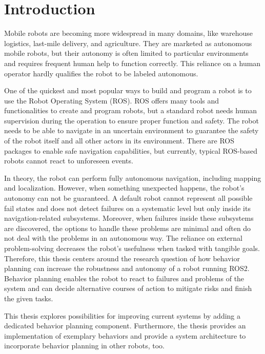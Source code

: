 \chapter{Introduction}
\label{cha:introduction}

Mobile robots are becoming more widespread in many domains, like warehouse logistics, last-mile delivery, and agriculture. They are marketed as autonomous mobile robots, but their autonomy is often limited to particular environments and requires frequent human help to function correctly. This reliance on a human operator hardly qualifies the robot to be labeled autonomous. 

One of the quickest and most popular ways to build and program a robot is to use the Robot Operating System (ROS). ROS offers many tools and functionalities to create and program robots, but a standard robot needs human supervision during the operation to ensure proper function and safety. The robot needs to be able to navigate in an uncertain environment to guarantee the safety of the robot itself and all other actors in its environment. There are ROS packages to enable safe navigation capabilities, but currently, typical ROS-based robots cannot react to unforeseen events.

In theory, the robot can perform fully autonomous navigation, including mapping and localization. However, when something unexpected happens, the robot's autonomy can not be guaranteed. A default robot cannot represent all possible fail states and does not detect failures on a systematic level but only inside its navigation-related subsystems. Moreover, when failures inside these subsystems are discovered, the options to handle these problems are minimal and often do not deal with the problems in an autonomous way. The reliance on external problem-solving decreases the robot's usefulness when tasked with tangible goals. 
Therefore, this thesis centers around the research question of how behavior planning can increase the robustness and autonomy of a robot running ROS2. Behavior planning enables the robot to react to failures and problems of the system and can decide alternative courses of action to mitigate risks and finish the given tasks.

This thesis explores possibilities for improving current systems by adding a dedicated behavior planning component. Furthermore, the thesis provides an implementation of exemplary behaviors and provide a system architecture to incorporate behavior planning in other robots, too.

